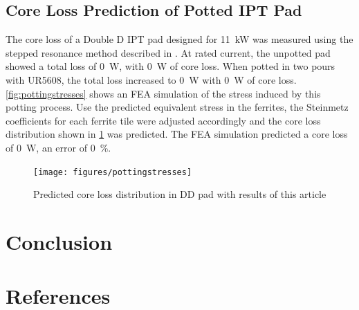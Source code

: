 \documentclass[conference]{IEEEtran}
\begin{document}
\subsection{Core Loss Prediction of Potted IPT Pad}
The core loss of a Double D IPT pad designed for \SI{11}{\kilo\watt} was measured using the stepped resonance method described in \cite{kalraPowerLossMeasurement2020}.
At rated current, the unpotted pad showed a total loss of \SI{0}{\watt}, with \SI{0}{\watt} of core loss.
When potted in two pours with UR5608, the total loss increased to \SI{0}{\watt} with \SI{0}{\watt} of core loss. 
\cref{fig:pottingstresses} shows an FEA simulation of the stress induced by this potting process. 
Use the predicted equivalent stress in the ferrites, the Steinmetz coefficients for each ferrite tile were adjusted accordingly and the core loss distribution shown in \cref{fig:padcoreloss} was predicted. 
The FEA simulation predicted a core loss of \SI{0}{\watt}, an error of \SI{0}{\percent}. 
\begin{figure}[t]
  \texttt{[image: figures/pottingstresses]}
  \caption{Predicted core loss distribution in DD pad with results of this article}
  \label{fig:padcoreloss}
\end{figure}

\section{Conclusion}

\section*{References}
\printbibliography[heading=none]
\end{document}

